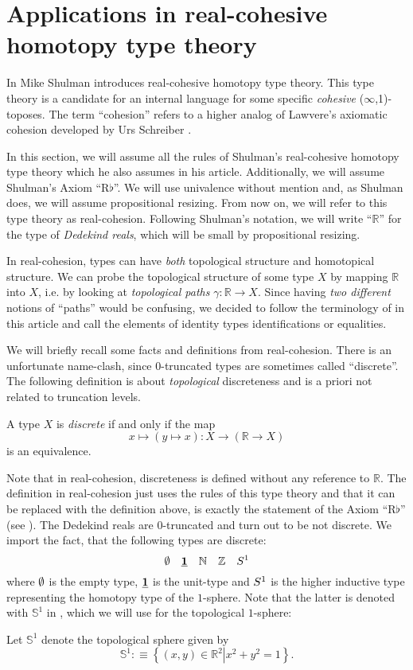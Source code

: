 \documentclass[9pt,twosided]{amsart}
\newcommand{\bN}{\mathbb N}
\newcommand{\bZ}{\mathbb Z}
\newcommand{\bR}{\mathbb R}
\newcommand{\bS}{\mathbb S}
\begin{document}
\section{Applications in real-cohesive homotopy type theory}
\label{subsection:toplogical stacks}

In \cite[Section 8]{ShulmanRealCohesion} Mike Shulman introduces real-cohesive homotopy type theory.
This type theory is a candidate for an internal language for some specific \emph{cohesive} ($\infty$,1)-toposes.
The term ``cohesion'' refers to a higher analog 
of Lawvere's axiomatic cohesion \cite{Lawvere07} developed by Urs Schreiber \cite{SchreiberDcct}.

In this section, we will assume all the rules of Shulman's real-cohesive homotopy type theory which he also assumes in his article.
Additionally, we will assume Shulman's Axiom ``$\mathrm{R}\flat$''.
We will use univalence without mention and, as Shulman does, we will assume propositional resizing.
From now on, we will refer to this type theory as real-cohesion.
Following Shulman's notation, we will write  ``$\bR$'' for the type of \emph{Dedekind reals}, which will be small by propositional resizing.

In real-cohesion, types can have \emph{both} topological structure and homotopical structure.
We can probe the topological structure of some type $X$ by mapping $\bR$ into $X$,
i.e. by looking at \emph{topological paths} $\gamma:\bR\to X$.
Since having \emph{two different} notions of ``paths'' would be confusing,
we decided to follow the terminology of \cite{ShulmanRealCohesion} in this article and call the elements of identity types identifications or equalities.

We will briefly recall some facts and definitions from real-cohesion.
There is an unfortunate name-clash, since 0-truncated types are sometimes called ``discrete''.
The following definition is about \emph{topological} discreteness and is a priori not related to truncation levels.
\begin{defn}
  A type $X$ is \emph{discrete} if and only if the map
  \[ x\mapsto (y\mapsto x) : X \to (\bR \to X) \]
  is an equivalence.
\end{defn}
Note that in real-cohesion, discreteness is defined without any reference to $\bR$.
The definition in real-cohesion just uses the rules of this type theory and that it can be replaced with the definition above,
is exactly the statement of the Axiom ``$\mathrm{R}\flat$'' (see \cite[Section 8]{ShulmanRealCohesion}).
The Dedekind reals are 0-truncated and turn out to be not discrete.
We import the fact, that the following types are discrete:
\[ \emptyt \quad \unit \quad \bN \quad \bZ \quad \sphere{1} \]
where $\emptyset$ is the empty type,
$\underline{\mathbf{1}}$ is the unit-type and $S^{1}$ is the higher inductive type representing the homotopy type of the $1$-sphere.
Note that the latter is denoted with $\bS^1$ in \cite{UFP}, which we will use for the topological $1$-sphere:
\begin{defn}
  Let $\bS^{1}$ denote the topological sphere given by
  \[ \bS^{1}:\equiv\left\{ (x,y)\in\bR^{2}\left\vert x^2+y^2=1\right.\right\}.\]
\end{defn}
\end{document}

